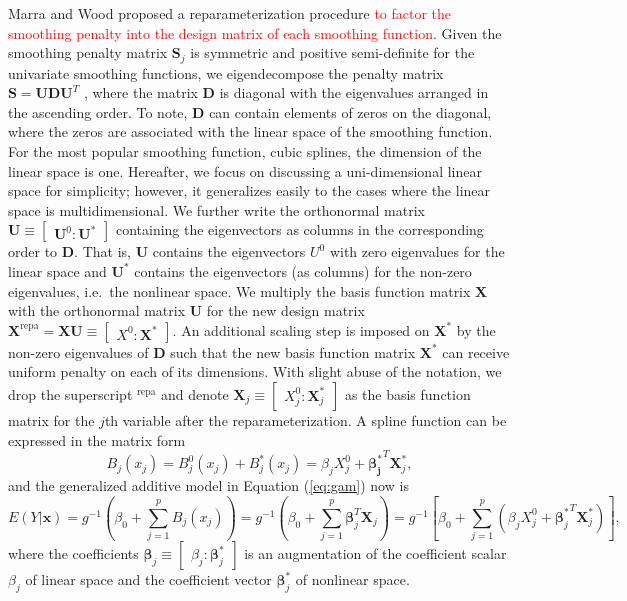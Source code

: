 \documentclass[AMA,STIX1COL,]{WileyNJD-v2}
\begin{document}
Marra and Wood \citep{Marra2011} proposed a reparameterization procedure
\textcolor{red}{to factor the smoothing penalty into the design matrix of each smoothing function}.
Given the smoothing penalty matrix \(\boldsymbol{S}_j\) is symmetric and
positive semi-definite for the univariate smoothing functions, we
eigendecompose the penalty matrix
\(\boldsymbol{S} = \boldsymbol{U} \boldsymbol{D} \boldsymbol{U}^T\) ,
where the matrix \(\boldsymbol{D}\) is diagonal with the eigenvalues
arranged in the ascending order. To note, \(\boldsymbol{D}\) can contain
elements of zeros on the diagonal, where the zeros are associated with
the linear space of the smoothing function. For the most popular
smoothing function, cubic splines, the dimension of the linear space is
one. Hereafter, we focus on discussing a uni-dimensional linear space
for simplicity; however, it generalizes easily to the cases where the
linear space is multidimensional. We further write the orthonormal
matrix
\(\boldsymbol{U} \equiv \begin{bmatrix} \boldsymbol{U}^0 : \boldsymbol{U}^{*}\end{bmatrix}\)
containing the eigenvectors as columns in the corresponding order to
\(\boldsymbol{D}\). That is, \(\boldsymbol{U}\) contains the
eigenvectors \(U^0\) with zero eigenvalues for the linear space and
\(\boldsymbol{U}^{*}\) contains the eigenvectors (as columns) for the
non-zero eigenvalues, i.e.~the nonlinear space. We multiply the basis
function matrix \(\boldsymbol{X}\) with the orthonormal matrix
\(\boldsymbol{U}\) for the new design matrix
\({\boldsymbol{X}}^\text{repa}= \boldsymbol{X} \boldsymbol{U} \equiv \begin{bmatrix} X^0 : \boldsymbol{X}^{*} \end{bmatrix}\).
An additional scaling step is imposed on \(\boldsymbol{X}^{*}\) by the
non-zero eigenvalues of \(\boldsymbol{D}\) such that the new basis
function matrix \(\boldsymbol{X}^\ast\) can receive uniform penalty on
each of its dimensions. With slight abuse of the notation, we drop the
superscript \(^\text{repa}\) and denote
\(\boldsymbol{X}_j \equiv \begin{bmatrix} X_j^0 : \boldsymbol{X}_j^{*} \end{bmatrix}\)
as the basis function matrix for the \(j\)th variable after the
reparameterization. A spline function can be expressed in the matrix
form \[
B_j(x_j) = B_j^0(x_j) + B_j^*(x_j) = \beta_j X^0_j + \boldsymbol{\beta_j^*}^T \boldsymbol{X}_j^*,
\] and the generalized additive model in Equation (\ref{eq:gam}) now is
\begin{equation}\label{eq:gam-repa}
E(Y|\boldsymbol{x}) = g^{-1}(\beta_0 + \sum\limits^p_{j=1} B_j(x_j)) = g^{-1}(\beta_0 + \sum\limits^p_{j=1} \boldsymbol{\beta}_j^T \boldsymbol{X}_j) = g^{-1}\left[\beta_0 + \sum\limits^p_{j=1} (\beta_j X^0_j + {\boldsymbol{\beta}_j^*}^T \boldsymbol{X}_j^*)\right],
\end{equation} where the coefficients
\(\boldsymbol{\beta}_j \equiv \begin{bmatrix} \beta_j : \boldsymbol{\beta}^*_j \end{bmatrix}\)
is an augmentation of the coefficient scalar \(\beta_j\) of linear space
and the coefficient vector \(\boldsymbol{\beta}^*_j\) of nonlinear
space.
\end{document}
